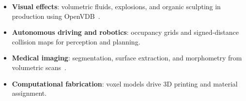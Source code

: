 \begin{itemize}
    \item \textbf{Visual effects}: volumetric fluids, explosions, and organic sculpting in production using OpenVDB~\cite{museth2013}.
    \item \textbf{Autonomous driving and robotics}: occupancy grids and signed-distance collision maps for perception and planning.
    \item \textbf{Medical imaging}: segmentation, surface extraction, and morphometry from volumetric scans~\cite{lorensen1987}.
    \item \textbf{Computational fabrication}: voxel models drive 3D printing and material assignment.
\end{itemize}
